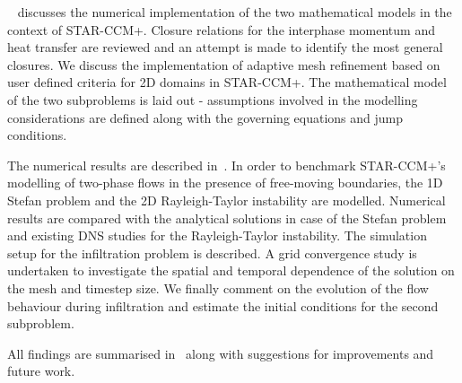  {}~ discusses the numerical implementation of the two mathematical models in the context 
 of STAR-CCM+. Closure relations for the interphase momentum and heat transfer are reviewed and 
 an attempt is made to identify the most general closures. We discuss the implementation of 
 adaptive mesh refinement based on user defined criteria for 2D domains in STAR-CCM+. The mathematical model 
 of the two subproblems is laid out - assumptions involved in the modelling considerations are
 defined along with the governing equations and jump conditions. 

 The numerical results are described in~. In order to benchmark STAR-CCM+'s modelling of two-phase flows 
 in the presence of free-moving boundaries, the 1D Stefan 
 problem and the 2D Rayleigh-Taylor instability are modelled. Numerical results are compared with the 
 analytical solutions in case of the Stefan problem and existing DNS studies for the Rayleigh-Taylor instability.
 The simulation setup for the infiltration problem is described. A grid convergence study is undertaken
 to investigate the spatial and temporal dependence of the solution on the mesh and timestep size. We finally
 comment on the evolution of the flow behaviour during infiltration and estimate the initial conditions
 for the second subproblem.

 All findings are summarised in~ along with suggestions for improvements and future work.






